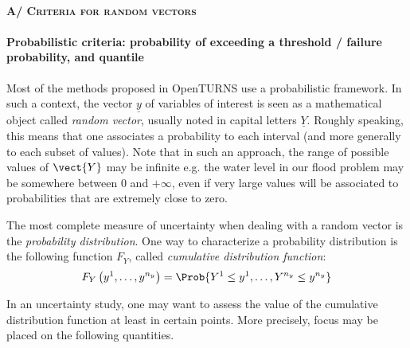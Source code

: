 \paragraph{\textsc{A/ Criteria for random vectors}}
\par


\paragraph{Probabilistic criteria: probability of exceeding a threshold / failure probability, and quantile}
\par

Most of the methods proposed in OpenTURNS use a probabilistic framework. In such a context, the vector $\underline{y}$ of variables of interest is seen as a mathematical object called {\em random vector}, usually noted in capital letters $\underline{Y}$. Roughly speaking, this means that one associates a probability to each interval (and more generally to each subset of values). Note that in such an approach, the range of possible values of $\vect{Y}$ may be infinite e.g. the water level in our flood problem may be somewhere between 0 and $+\infty$, even if very large values will be associated to probabilities that are extremely close to zero.

The most complete measure of uncertainty when dealing with a random vector is the {\em probability distribution}. One way to characterize a probability distribution is the following function $F_Y$, called {\em cumulative distribution function}:
\begin{align*}
  F_Y \left( y^1,\ldots,y^{n_y} \right) = \Prob{Y^1 \leq y^1,\ldots, Y^{n_y} \leq y^{n_y}}
\end{align*}

In an uncertainty study, one may want to assess the value of the cumulative distribution function at least in certain points. More precisely, focus may be placed on the following quantities.

